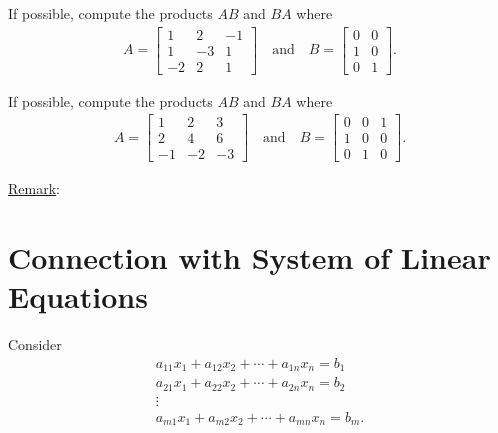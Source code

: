 \documentclass[12pt,a4paper]{article}
\newcounter{example}[section]
\begin{document}
	\begin{example}
	If possible, compute the products $AB$ and $BA$ where
		\begin{align*}
		A = \begin{bmatrix}
		1 & 2 & -1 \\
		1 & -3 & 1 \\
		-2 & 2 & 1
		\end{bmatrix}
		\quad \text{and} \quad
		B = \begin{bmatrix}
		0 & 0 \\
		1 & 0 \\
		0 & 1 
		\end{bmatrix} .
		\end{align*}
	\end{example}
	
\newpage

	\begin{example}
	If possible, compute the products $AB$ and $BA$ where
		\begin{align*}
		A = \begin{bmatrix}
		1 & 2 & 3 \\
		2 & 4 & 6 \\
		-1 & -2 & -3
		\end{bmatrix}
		\quad \text{and} \quad
		B = \begin{bmatrix}
		0 & 0 & 1 \\
		1 & 0 & 0 \\
		0 & 1 & 0
		\end{bmatrix} .
		\end{align*}
	\end{example}
	
	\vfill
	
	\noindent\underline{Remark}:
	
	\vspace*{2cm}
	
\newpage
	
\section{Connection with System of Linear Equations}
Consider
	\begin{align*}
	a_{11} x_1 + a_{12} x_2 + \cdots + a_{1n} x_n = b_1 \\
	a_{21} x_1 + a_{22} x_2 + \cdots + a_{2n} x_n = b_2 \\
	\vdots \phantom{aaaaaaaaaaaaa} \\
	a_{m1} x_1 + a_{m2} x_2 + \cdots + a_{mn} x_n = b_m  .
	\end{align*}
	
\end{document}
